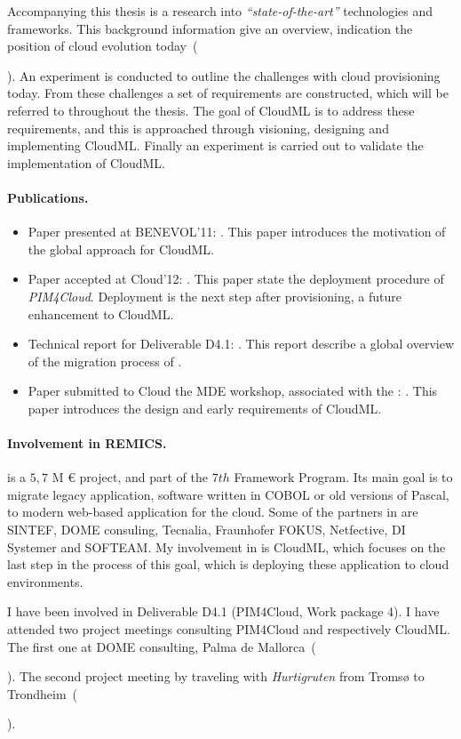 Accompanying this thesis is a research into \emph{``state-of-the-art''} technologies and frameworks.
This background information give an overview, 
indication the position of cloud evolution today~(\date{April 2012}).
An experiment is conducted to outline the challenges with cloud provisioning today.
From these challenges a set of requirements are constructed, which will be
referred to throughout the thesis.
The goal of CloudML is to address these requirements,
and this is approached through visioning, designing and implementing CloudML.
Finally an experiment is carried out to validate the implementation of CloudML.

\paragraph{Publications.}

\begin{itemize}
  \item
    Paper presented at BENEVOL'11:
    .
    This paper introduces the motivation of the global approach for CloudML.
  \item
    Paper accepted at Cloud'12:
    .
    This paper state the deployment procedure of \emph{PIM4Cloud}.
    Deployment is the next step after provisioning,
    a future enhancement to CloudML.
  \item 
    Technical report for Deliverable D4.1:
    .
    This report describe a global overview of the migration process of .
  \item
    Paper submitted to Cloud the MDE workshop, associated with the :
    .
    This paper introduces the design and early requirements of CloudML.
\end{itemize}

\paragraph{Involvement in REMICS.}

 is a $5,7$ M {\euro} project, and part of the $7th$ Framework Program.
Its main goal is to migrate legacy application,
\eg software written in COBOL or old versions of Pascal,
to modern web-based application for the cloud.
Some of the partners in  are SINTEF, DOME consuling, 
Tecnalia, Fraunhofer FOKUS, Netfective, DI Systemer and SOFTEAM.
My involvement in  is CloudML,
which focuses on the last step in the process of this goal,
which is deploying these application to cloud environments.

I have been involved in  Deliverable D4.1 (PIM4Cloud, Work package 4).
I have attended two project meetings consulting PIM4Cloud and respectively CloudML.
The first one at DOME consulting, Palma de Mallorca~(\date{June 2011}).
The second project meeting by traveling with \emph{Hurtigruten} from Troms{\o} to Trondheim~(\date{September 2011}).
